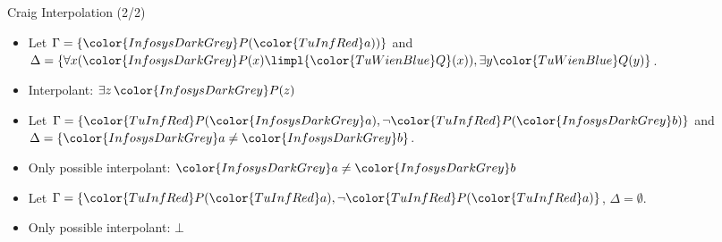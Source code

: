 \documentclass[final,compress]{beamer}
\newcommand{\colOne}[1]{{\color{TuInfRed}#1}}
\newcommand{\colTwo}[1]{{\color{TuWienBlue}#1}}
\newcommand{\colA}[1]{\colOne{#1}}
\newcommand{\colB}[1]{\colTwo{#1}}
\newcommand{\gray}[1]{{\color{InfosysDarkGrey}#1}}
\begin{document}
\subsection{}
\begin{frame}{Craig Interpolation (2/2)}
	\begin{example}
		\begin{itemize}
			\item Let $\Gamma = \{\gray P(\colA a)) \}$ and $\Delta = \{ \forall x (\gray P(x) \limpl \colB Q(x)), \exists y \colB Q(y) \}$.
				\pause
			\item Interpolant: $\exists z \,\gray P(z)$
		\end{itemize}
	\end{example}

	\pause

	\begin{example}
		\begin{itemize}
			\item Let $\Gamma = \{\colA P(\gray a), \lnot \colA P(\gray b)\}$ and $\Delta = \{ \gray a \neq \gray b \}$.
				\pause 
			\item Only possible interpolant: $\gray a \neq \gray b$
		\end{itemize}
	\end{example}

	\pause

	\begin{example}
		\begin{itemize}
			\item Let $\Gamma = \{\colA P(\colA a), \lnot \colA P(\colA a) \}$, $\Delta = \emptyset$.
				\pause 
			\item Only possible interpolant: $\bot$
		\end{itemize}
	\end{example}

\end{frame}
\end{document}
